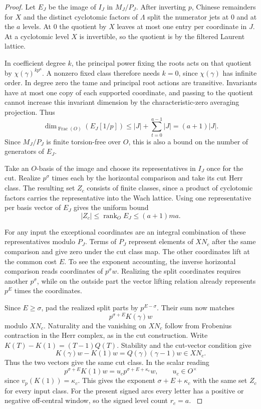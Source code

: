 \begin{proof}
Let \(E_J\) be the image of \(I_J\) in \(M_J/P_J\).
After inverting \(p\), Chinese remainders for \(X\) and the
distinct cyclotomic factors of \(\Lambda\) split the numerator
jets at \(0\) and at the \(a\) levels. At \(0\) the quotient by
\(X\) leaves at most one entry per coordinate in \(J\).
At a cyclotomic level \(X\) is invertible, so the quotient is
by the filtered Laurent lattice.

In coefficient degree \(k\),
the principal power fixing the roots acts on that quotient by
\(\chi(\gamma)^{k p^a}\). A nonzero fixed class therefore needs
\(k=0\), since \(\chi(\gamma)\) has infinite order. In degree
zero the tame and principal root actions are transitive. Invariants
have at most one copy of each supported coordinate, and passing
to the quotient cannot increase this invariant dimension by
the characteristic-zero averaging projection. Thus
\[
    \dim_{\operatorname{Frac}(O)}(E_J[1/p])
          \le |J|+\sum_{t=0}^{a-1}|J|=(a+1)|J| .
\]
Since \(M_J/P_J\) is finite torsion-free over \(O\), this is
also a bound on the number of generators of \(E_J\).

Take an \(O\)-basis of the image and choose its representatives
in \(I_J\) once for the cut. Realize \(p^\sigma\) times each
by the horizontal comparison and take its cut Herr class. The
resulting set \(Z_c\) consists of finite classes, since a
product of cyclotomic factors carries the representative into
the Wach lattice. Using one representative per basis vector of \(E_J\) gives the uniform bound
\[
 |Z_c|\le\operatorname{rank}_O E_J\le (a+1)ma.
\]

For any input the exceptional coordinates are an integral
combination of these representatives modulo \(P_J\).
Terms of \(P_J\) represent elements of \(XN_c\) after the
same comparison and give zero under the cut class map.
The other coordinates lift at the common cost \(E\). To see the
exponent accounting, the inverse horizontal comparison reads
coordinates of \(p^\sigma w\). Realizing the split coordinates
requires another \(p^\sigma\), while on the outside part the
vector lifting relation already represents \(p^E\) times the
coordinates.

Since \(E\ge\sigma\), pad the realized split parts
by \(p^{E-\sigma}\). Their sum now matches
\[
 p^{\sigma+E} K(\gamma)w
\]
modulo \(XN_c\). Naturality and the vanishing on
\(XN_c\) follow from Frobenius contraction in the Herr complex,
as in the cut construction. Write \(K(T)-K(1)=(T-1)Q(T)\). Stability and the cut-vector condition give
\[
 K(\gamma)w-K(1)w=Q(\gamma)(\gamma-1)w\in XN_c.
\]
Thus the two vectors give the same cut class. In the scalar reading
\[
        p^{\sigma+E}K(1)w
             = u_c p^{\sigma+E+\kappa_c}w,\qquad u_c\in O^\times
\]
since \(v_p(K(1))=\kappa_c\). This gives the exponent
\(\sigma+E+\kappa_c\) with the same set \(Z_c\) for every
input class. For the present signed arcs every letter has a
positive or negative off-central window, so the signed level count
\(r_c=a\). \label{cor:inert-short-exceptions-1}
\end{proof}

